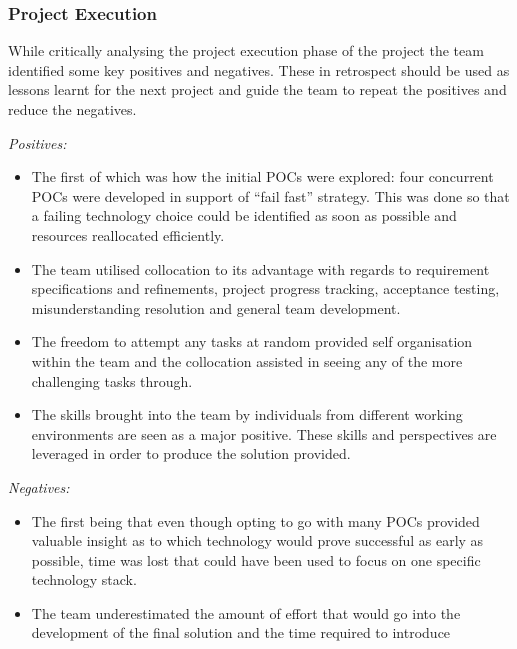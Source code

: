 \documentclass[12pt]{witseiepaper}
\begin{document}
\subsubsection{Project Execution}



While critically analysing the project execution phase of the project the team identified some key positives and negatives. These in retrospect should be used as lessons learnt for the next project and guide the team to repeat the positives and reduce the negatives.

\textit{Positives:}


\begin{itemize}
\item The first of which was how the initial POCs were explored: four concurrent POCs were developed in support of “fail fast” strategy. This was done so that a failing technology choice could be identified as soon as possible and resources reallocated efficiently.
\item The team utilised collocation to its advantage with regards to requirement specifications and refinements, project progress tracking, acceptance testing, misunderstanding resolution and general team development. 
\item The freedom to attempt any tasks at random provided self organisation within the team and the collocation assisted in seeing any of the more challenging tasks through.
\item The skills brought into the team by individuals from different working environments are seen as a major positive. These skills and perspectives are leveraged in order to produce the solution provided.
\end{itemize}

\textit{Negatives:}

\begin{itemize}
\item The first being that even though opting to go with many POCs provided valuable insight as to which technology would prove successful as early as possible, time was lost that could have been used to focus on one specific technology stack.
\item The team underestimated the amount of effort that would go into the development of the final solution and the time required to introduce 
\end{itemize}


\end{document}
